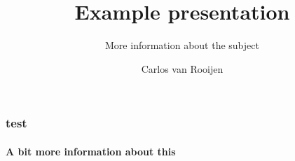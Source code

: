 \documentclass{hu-presentatie}
\begin{document}
 
 \title{Example presentation}
 \subtitle{More information about the subject}
 \author{Carlos van Rooijen} 
 
 \frame{\titlepage}
 
  \begin{frame}
    \frametitle{test}
    \framesubtitle{A bit more information about this}
  \end{frame}
\end{document}
